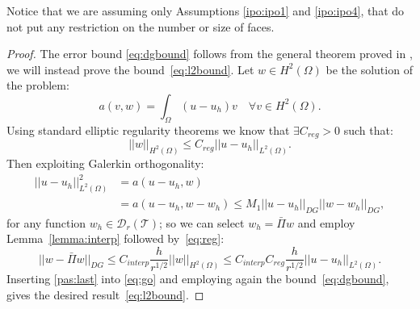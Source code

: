\documentclass[12pt, a4paper]{article}
\theoremstyle{definition}
\theoremstyle{plain}
\theoremstyle{plain}
\newtheorem{teor}{Theorem}
\theoremstyle{definition}
\begin{document}
Notice that we are assuming only Assumptions \ref{ipo:ipo1} and \ref{ipo:ipo4}, 
that do not put any restriction on the number or size of faces.
\begin{proof}
	The error bound \eqref{eq:dgbound} follows from the general theorem proved 
	in \cite{hpmet}, we will instead prove the bound~\eqref{eq:l2bound}. Let $w 
	\in H^2(\Omega)$ be the solution of the problem:
	\begin{equation*}
		a(v, w) = \int_{\Omega} (u-u_h)v \quad \forall v \in  H^2(\Omega).
	\end{equation*}
	Using standard elliptic regularity theorems we know that $\exists C_{reg}>0$ such that:
	\begin{equation} \label{eq:reg}
		|\!| w |\!|_{H^2(\Omega)} \leq C_{reg} |\!| u - u_h |\!|_{L^2(\Omega)}.
	\end{equation}
	Then exploiting Galerkin orthogonality:
	\begin{equation} \label{eq:go}
	\begin{split}
		|\!| u - u_h |\!|^2_{L^2(\Omega)} &= a(u-u_h, w)\\
		&= a(u-u_h, w-w_h) \leq M_1 |\!| u - u_h |\!|_{DG} |\!| w - w_h |\!|_{DG},
	\end{split}
	\end{equation}
	for any function $w_h \in \mathcal{D}_r(\mathcal{T})$; so we can select 
	$w_h = \bar{\Pi}w$ and employ Lemma~\ref{lemma:interp} followed 
	by~\eqref{eq:reg}:
	\begin{equation} \label{pas:last}
		|\!|w-\bar{\Pi}w|\!|_{DG} \leq C_{interp} \frac{h}{r^{1/2}} |\!| w |\!|_{H^2(\Omega)} \leq C_{interp}C_{reg} \frac{h}{r^{1/2}} |\!| u-u_h |\!|_{L^2(\Omega)}.
	\end{equation}
	Inserting \eqref{pas:last} into \eqref{eq:go} and employing again the 
	bound~\eqref{eq:dgbound}, gives the desired result~\eqref{eq:l2bound}.
\end{proof}	
\end{document}

